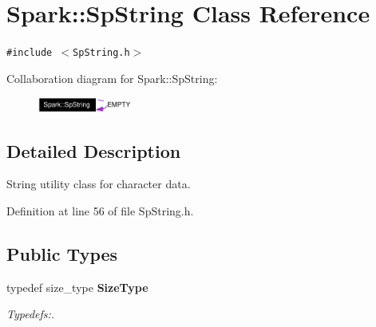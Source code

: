 \section{Spark::Sp\-String Class Reference}
\label{classSpark_1_1SpString}
{\tt \#include $<$Sp\-String.h$>$}

Collaboration diagram for Spark::Sp\-String:\begin{figure}[H]
\begin{center}
\leavevmode
\includegraphics[width=88pt]{classSpark_1_1SpString__coll__graph}
\end{center}
\end{figure}


\subsection{Detailed Description}
String utility class for character data. 

Definition at line 56 of file Sp\-String.h.\subsection*{Public Types}
\begin{CompactItemize}
\item 
typedef size\_\-type {\bf Size\-Type}
\begin{CompactList}\small\item\em Typedefs:. \item\end{CompactList}\end{CompactItemize}
